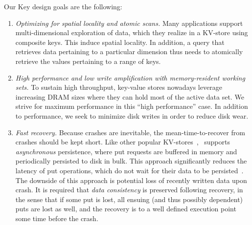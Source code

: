 Our Key design goals are the following:
\begin{enumerate}\itemsep0pt
\item \emph{Optimizing for spatial locality and atomic scans.}
 Many applications support multi-dimensional exploration of data, 
 which they realize in a KV-store using composite keys. This induce spatial locality.  
In addition, a query that retrieves data pertaining to a particular dimension thus needs to atomically 
retrieve the values pertaining to a range of keys. 
 

\item \emph{High performance and low write amplification with memory-resident working sets.}
To sustain high throughput, key-value stores nowadays leverage increasing DRAM sizes where they can hold most of the 
active data set. We strive for maximum performance in this ``high performance'' case.  
In addition to performance, we seek to minimize disk writes in order to reduce disk wear.

\item \emph{Fast recovery.}
Because crashes are inevitable, the mean-time-to-recover from crashes should be kept short.
Like other popular KV-stores~\cite{RocksDB,leveldb,hbase}, \sys\ supports \emph{asynchronous} persistence, 
where put requests are buffered in memory and periodically persisted to disk in bulk. 
This approach significantly reduces the latency of put operations, which do not wait for their data to be persisted~\cite{asynchOverSync}.
The downside of this approach is potential loss of recently written data upon crash. 
It is required that \emph{data consistency} is preserved following recovery, in the sense that 
if some put is lost, all ensuing (and thus possibly dependent) puts are lost as well, and the recovery is to a well 
defined execution point some time before the crash.
 
\end{enumerate}

